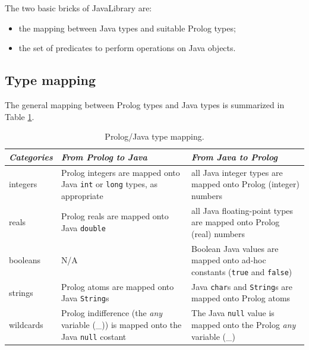 The two basic bricks of JavaLibrary are:
\begin{itemize}
  \item the mapping between Java types and suitable Prolog types;
  \item the set of predicates to perform operations on Java objects.
\end{itemize}

\subsection{Type mapping}

The general mapping between Prolog types and Java types is summarized in Table \ref{tab:prolog-java-type-mapping}.

\begin{table}[h]
  \centering
  \begin{tabular}{|p{1.8cm}|p{4.7cm}|p{4.7cm}|}
  \hline
  \textit{Categories} & \textit{From Prolog to Java} & \textit{From Java to Prolog}\\
  \hline
  integers   & Prolog integers are mapped onto Java \texttt{int} or \texttt{long} types, as appropriate & all Java integer types are mapped onto Prolog (integer) numbers\\
  \hline
  reals      & Prolog reals are mapped onto Java \texttt{double} & all Java floating-point types are mapped onto Prolog (real) numbers\\
  \hline
  booleans   & N/A & Boolean Java values are mapped onto ad-hoc constants (\texttt{true} and \texttt{false})\\
  \hline
  strings    & Prolog atoms are mapped onto Java \texttt{String}s & Java \texttt{char}s and \texttt{String}s are mapped onto Prolog atoms\\
  \hline
  wildcards  & Prolog indifference (the \textit{any} variable (\_)) is mapped onto the Java \texttt{null} costant & The Java \texttt{null} value is mapped onto the Prolog \textit{any} variable (\_)\\
  \hline
  \end{tabular}
  \caption{Prolog/Java type mapping.}\label{tab:prolog-java-type-mapping}
\end{table}


